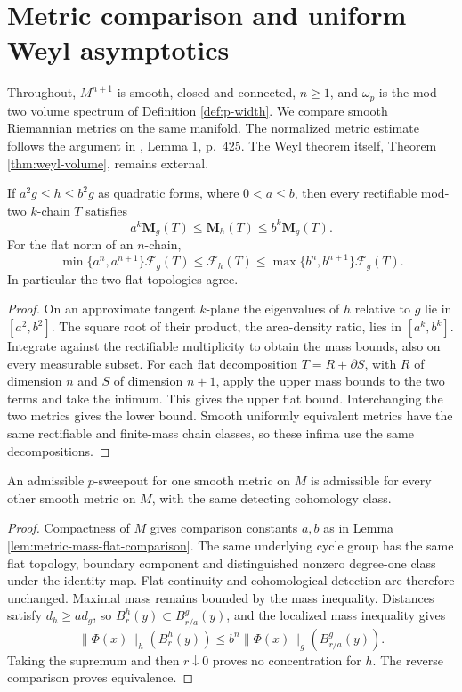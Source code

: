 \chapter{Metric comparison and uniform Weyl asymptotics}\label{sec:width-metrics}
Throughout, $M^{n+1}$ is smooth, closed and connected, $n\geq1$, and $\omega_p$ is the mod-two volume spectrum of Definition \ref{def:p-width}. We compare smooth Riemannian metrics on the same manifold. The normalized metric estimate follows the argument in \cite{MNS19}, Lemma 1, p.~425. The Weyl theorem itself, Theorem \ref{thm:weyl-volume}, remains external.

\begin{lemma}\label{lem:metric-mass-flat-comparison}
If $a^2g\leq h\leq b^2g$ as quadratic forms, where $0<a\leq b$, then every rectifiable mod-two $k$-chain $T$ satisfies
\[
 a^k\mathbf M_g(T)\leq\mathbf M_h(T)\leq b^k\mathbf M_g(T).
\]
For the flat norm of an $n$-chain,
\[
 \min\{a^n,a^{n+1}\}\mathcal F_g(T)
 \leq\mathcal F_h(T)
 \leq\max\{b^n,b^{n+1}\}\mathcal F_g(T).
\]
In particular the two flat topologies agree.
\end{lemma}
\begin{proof}
On an approximate tangent $k$-plane the eigenvalues of $h$ relative to $g$ lie in $[a^2,b^2]$. The square root of their product, the area-density ratio, lies in $[a^k,b^k]$. Integrate against the rectifiable multiplicity to obtain the mass bounds, also on every measurable subset. For each flat decomposition $T=R+\partial S$, with $R$ of dimension $n$ and $S$ of dimension $n+1$, apply the upper mass bounds to the two terms and take the infimum. This gives the upper flat bound. Interchanging the two metrics gives the lower bound. Smooth uniformly equivalent metrics have the same rectifiable and finite-mass chain classes, so these infima use the same decompositions.
\end{proof}

\begin{proposition}\label{prop:metric-sweepout-admissibility}
An admissible $p$-sweepout for one smooth metric on $M$ is admissible for every other smooth metric on $M$, with the same detecting cohomology class.
\end{proposition}
\begin{proof}
Compactness of $M$ gives comparison constants $a,b$ as in Lemma \ref{lem:metric-mass-flat-comparison}. The same underlying cycle group has the same flat topology, boundary component and distinguished nonzero degree-one class under the identity map. Flat continuity and cohomological detection are therefore unchanged. Maximal mass remains bounded by the mass inequality. Distances satisfy $d_h\geq a d_g$, so $B_r^h(y)\subset B_{r/a}^g(y)$, and the localized mass inequality gives
\[
 \|\Phi(x)\|_h(B_r^h(y))
 \leq b^n\|\Phi(x)\|_g(B_{r/a}^g(y)).
\]
Taking the supremum and then $r\downarrow0$ proves no concentration for $h$. The reverse comparison proves equivalence.
\end{proof}

